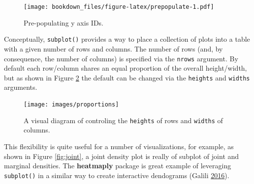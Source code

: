 \documentclass[12pt,]{isuthesis}
\newenvironment{Shaded}{\begin{snugshade}}{\end{snugshade}}
\newcommand{\KeywordTok}[1]{\textcolor[rgb]{0.13,0.29,0.53}{\textbf{{#1}}}}
\newcommand{\DataTypeTok}[1]{\textcolor[rgb]{0.13,0.29,0.53}{{#1}}}
\newcommand{\DecValTok}[1]{\textcolor[rgb]{0.00,0.00,0.81}{{#1}}}
\newcommand{\StringTok}[1]{\textcolor[rgb]{0.31,0.60,0.02}{{#1}}}
\newcommand{\OtherTok}[1]{\textcolor[rgb]{0.56,0.35,0.01}{{#1}}}
\newcommand{\NormalTok}[1]{{#1}}
\begin{document}
\begin{Shaded}
\end{Shaded}

\begin{figure}[htbp]
\centering
\texttt{[image: bookdown\_files/figure-latex/prepopulate-1.pdf]}
\caption{\label{fig:prepopulate}Pre-populating y axis IDs.}
\end{figure}

Conceptually, \texttt{subplot()} provides a way to place a collection of
plots into a table with a given number of rows and columns. The number
of rows (and, by consequence, the number of columns) is specified via
the \texttt{nrows} argument. By default each row/column shares an equal
proportion of the overall height/width, but as shown in Figure
\ref{fig:proportions} the default can be changed via the
\texttt{heights} and \texttt{widths} arguments.

\begin{figure}[htbp]
\centering
\texttt{[image: images/proportions]}
\caption{\label{fig:proportions}A visual diagram of controling the
\texttt{heights} of rows and \texttt{widths} of columns.}
\end{figure}

This flexibility is quite useful for a number of visualizations, for
example, as shown in Figure \ref{fig:joint}, a joint density plot is
really of subplot of joint and marginal densities. The
\textbf{heatmaply} package is great example of leveraging
\texttt{subplot()} in a similar way to create interactive dendograms
(Galili \protect\hyperlink{ref-heatmaply}{2016}).
\end{document}
